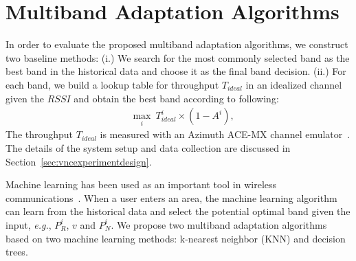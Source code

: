 
\section{Multiband Adaptation Algorithms}
\label{subsec:algorithms}

In order to evaluate the proposed multiband adaptation algorithms, 
we construct two baseline methods: (i.) We search for the
most commonly selected band as the best band in the historical data
and choose it as the final band decision. (ii.) For each band, we build 
a lookup table for throughput $T_{ideal}$ in an idealized channel given the $RSSI$ and obtain 
the best band according to following:
\begin{align}
&\max_i\ T_{ideal}^i\times(1-A^i),
\label{eq:baseline2}
\end{align}
The throughput $T_{ideal}$ is measured with an Azimuth ACE-MX channel emulator~\cite{AzimuthACE}. 
The details of the system setup and data collection are discussed in Section~\ref{sec:vncexperimentdesign}. 

Machine learning has been used as an important tool in wireless communications~\cite{haykin2005cognitive}. When a user enters an area, the machine
learning algorithm can learn from the historical data and
select the potential optimal band given the input, {\it e.g.}, $P_R^i$, $v$
and $P_N^i$. We propose two multiband adaptation algorithms based on
two machine learning methods: k-nearest neighbor (KNN) and decision trees.

